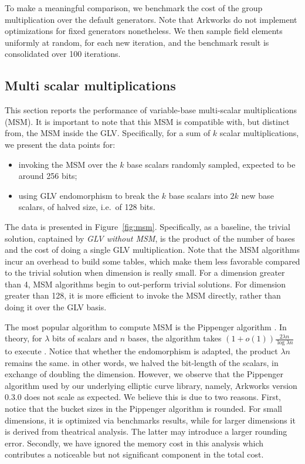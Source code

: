 \documentclass[smallextended]{svjour3}
\begin{document}
To make a meaningful comparison, we benchmark
the cost of the group multiplication over the default generators.
Note that Arkworks do not implement optimizations for 
fixed generators nonetheless. We then sample field elements 
uniformly at random, for each new iteration, and the benchmark
result is consolidated over 100 iterations.

\subsection{Multi scalar multiplications}
This section reports the performance of variable-base multi-scalar multiplications (MSM). It is important to note that this MSM is compatible with, but distinct from, the MSM inside the GLV. Specifically, for a sum of $k$ scalar multiplications, we present the data points for:

\begin{itemize}
  \item invoking the MSM over the $k$ base scalars randomly sampled,
    expected to be around 256 bits;
  \item using GLV endomorphism to break the $k$ base scalars into $2k$
    new base scalars, of halved size, i.e.~of 128 bits.
\end{itemize}
The data is presented in Figure~\ref{fig:msm}. Specifically, 
as a baseline, the trivial solution, captained by 
{\em GLV without 
MSM}, is the product of the number of bases and the cost of
doing a single GLV multiplication. 
Note that the MSM algorithms incur an overhead to build some
tables, which make them less favorable compared to the trivial
solution when dimension is really small. For a dimension greater 
than 4, MSM algorithms begin to out-perform trivial solutions.
For dimension greater than 128, it is more efficient to 
invoke the MSM directly, rather than doing it over the GLV basis.


The most popular algorithm to compute MSM is the Pippenger algorithm \cite{pip80}. 
In theory, for $\lambda$ bits of scalars and $n$ bases, the algorithm takes
$(1 + o(1))\frac{2\lambda n}{\log \lambda n}$ to execute \cite{msm}.
Notice that whether the endomorphism is adapted, the product $\lambda n$ 
remains the same. in other words, we halved the bit-length of the scalars,
in exchange of doubling the dimension. However, we observe that the 
Pippenger algorithm used by our underlying elliptic curve library, 
namely, Arkworks version 0.3.0 \cite{arkworks} does not scale as expected.
We believe this is due to two reasons. First, notice that the bucket sizes 
in the Pippenger algorithm is rounded. 
For small dimensions, it is optimized via benchmarks results, while for larger 
dimensions it is derived from theatrical analysis. The latter may 
introduce a larger rounding error. Secondly, we have ignored the memory
cost in this analysis which contributes a noticeable but not significant 
component in the total cost.
\end{document}
